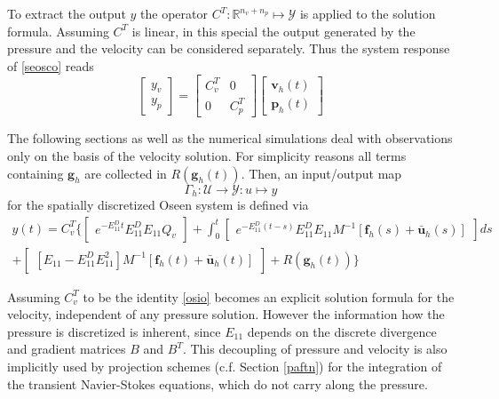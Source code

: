 \documentclass[a4paper,10pt,BCOR=15mm]{scrbook}
\begin{document}
To extract the output $y$ the operator $C^T:\mathbb R ^{n_v + n_p} \mapsto \mathcal Y$ is applied to the solution formula. Assuming $C^T$ is linear, in this special the output generated by the pressure and the velocity can be considered separately. Thus the system response of \eqref{seosco} reads
\begin{equation*}
 \begin{bmatrix} y_{v} \\  y_{p} \end{bmatrix} = \begin{bmatrix} C_v^T & 0 \\ 0 & C_p^T \end{bmatrix} \begin{bmatrix} \mathbf v_h(t) \\ \mathbf p_h(t) \end{bmatrix}
\end{equation*}

The following sections as well as the numerical simulations deal with observations only on the basis of the velocity solution. For simplicity reasons all terms containing $\mathbf g_h $ are collected in $R( \mathbf g_h(t))$.  Then, an input/output map 
\begin{equation*}
 \Gamma_h:\mathcal U \rightarrow \mathcal Y:u\mapsto y
\end{equation*}
for the spatially discretized Oseen system is defined via
\begin{multline}\label{osio}
  y(t) = C_v^T\bigl \{ \begin{bmatrix} e^{-E_{11}^Dt}E_{11}^DE_{11} Q_v \end{bmatrix}
+\int_0^t \begin{bmatrix} e^{-E_{11}^D(t-s)}  E_{11}^D E_{11}M^{-1}[\mathbf f_h(s)  + \bar {\mathbf u}_h(s)] \end{bmatrix}ds  \\ +
 \begin{bmatrix} [E_{11} - E_{11}^DE_{11}^2] M^{-1}[\mathbf f_h (t)+ \bar {\mathbf u}_h(t)]  \end{bmatrix} + R( \mathbf g_h(t)) \bigr \}
\end{multline}

\begin{rem}
 Assuming $C_v ^T$ to be the identity \eqref{osio} becomes an explicit solution formula for the velocity, independent of any pressure solution. However the information how the pressure is discretized is inherent, since $E_{11}$ depends on the discrete divergence and gradient matrices $B$ and $B^T$. This decoupling of pressure and velocity is also implicitly used by projection schemes (c.f. Section \ref{paftn}) for the integration of the transient Navier-Stokes equations, which do not carry along the pressure.
\end{rem}
\end{document}
